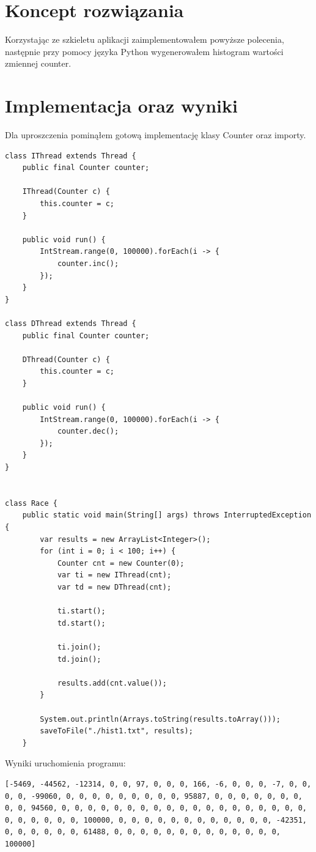 \documentclass[12pt]{article}
\begin{document}
\section{Koncept rozwiązania}
Korzystając ze szkieletu aplikacji zaimplementowałem powyższe polecenia, następnie przy pomocy języka Python wygenerowałem histogram wartości zmiennej counter.

\section{Implementacja oraz wyniki}
Dla uproszczenia pominąłem gotową implementację klasy Counter oraz importy.

\begin{verbatim}
class IThread extends Thread {
    public final Counter counter;

    IThread(Counter c) {
        this.counter = c;
    }

    public void run() {
        IntStream.range(0, 100000).forEach(i -> {
            counter.inc();
        });
    }
}

class DThread extends Thread {
    public final Counter counter;

    DThread(Counter c) {
        this.counter = c;
    }

    public void run() {
        IntStream.range(0, 100000).forEach(i -> {
            counter.dec();
        });
    }
}


class Race {
    public static void main(String[] args) throws InterruptedException {
        var results = new ArrayList<Integer>();
        for (int i = 0; i < 100; i++) {
            Counter cnt = new Counter(0);
            var ti = new IThread(cnt);
            var td = new DThread(cnt);

            ti.start();
            td.start();

            ti.join();
            td.join();

            results.add(cnt.value());
        }

        System.out.println(Arrays.toString(results.toArray()));
        saveToFile("./hist1.txt", results);
    }
\end{verbatim}

Wyniki uruchomienia programu:
\begin{verbatim}
[-5469, -44562, -12314, 0, 0, 97, 0, 0, 0, 166, -6, 0, 0, 0, -7, 0, 0, 0, 0, -99060, 0, 0, 0, 0, 0, 0, 0, 0, 0, 95887, 0, 0, 0, 0, 0, 0, 0, 0, 0, 94560, 0, 0, 0, 0, 0, 0, 0, 0, 0, 0, 0, 0, 0, 0, 0, 0, 0, 0, 0, 0, 0, 0, 0, 0, 0, 100000, 0, 0, 0, 0, 0, 0, 0, 0, 0, 0, 0, 0, -42351, 0, 0, 0, 0, 0, 0, 61488, 0, 0, 0, 0, 0, 0, 0, 0, 0, 0, 0, 0, 0, 100000]
\end{verbatim}
\end{document}
